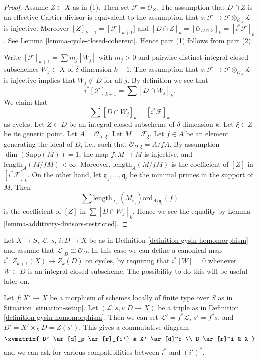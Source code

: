 \begin{proof}
Assume $Z \subset X$ as in (1). Then set $\mathcal{F} = \mathcal{O}_Z$.
The assumption that $D \cap Z$ is an effective Cartier divisor is
equivalent to the assumption that
$s : \mathcal{F} \to \mathcal{F} \otimes_{\mathcal{O}_X} \mathcal{L}$
is injective. Moreover $[Z]_{k + 1} = [\mathcal{F}]_{k + 1}]$
and $[D \cap Z]_k = [\mathcal{O}_{D \cap Z}]_k = [i^*\mathcal{F}]_k$.
See Lemma \ref{lemma-cycle-closed-coherent}.
Hence part (1) follows from part (2).

\medskip\noindent
Write $[\mathcal{F}]_{k + 1} = \sum m_j[W_j]$ with $m_j > 0$
and pairwise distinct integral closed subschemes $W_j \subset X$
of $\delta$-dimension $k + 1$. The assumption that
$s : \mathcal{F} \to \mathcal{F} \otimes_{\mathcal{O}_X} \mathcal{L}$
is injective implies that $W_j \not \subset D$ for all $j$.
By definition we see that
$$
i^*[\mathcal{F}]_{k + 1} = \sum [D \cap W_j]_k.
$$
We claim that
$$
\sum [D \cap W_j]_k = [i^*\mathcal{F}]_k
$$
as cycles.
Let $Z \subset D$ be an integral closed subscheme of $\delta$-dimension
$k$. Let $\xi \in Z$ be its generic point. Let $A = \mathcal{O}_{X, \xi}$.
Let $M = \mathcal{F}_\xi$. Let $f \in A$ be an element generating the
ideal of $D$, i.e., such that $\mathcal{O}_{D, \xi} = A/fA$.
By assumption $\dim(\text{Supp}(M)) = 1$,
the map $f : M \to M$ is injective, and
$\text{length}_A(M/fM) < \infty$. Moreover, $\text{length}_A(M/fM)$
is the coefficient of $[Z]$ in $[i^*\mathcal{F}]_k$. On the
other hand, let $\mathfrak q_1, \ldots, \mathfrak q_t$ be the minimal
primes in the support of $M$. Then
$$
\sum
\text{length}_{A_{\mathfrak q_i}}(M_{\mathfrak q_i})
\text{ord}_{A/\mathfrak q_i}(f)
$$
is the coefficient of $[Z]$ in $\sum [D \cap W_j]_k$.
Hence we see the equality by
Lemma \ref{lemma-additivity-divisors-restricted}.
\end{proof}

\begin{remark}
\label{remark-gysin-on-cycles}
Let $X \to S$, $\mathcal{L}$, $s$, $i : D \to X$ be as in
Definition \ref{definition-gysin-homomorphism} and assume
that $\mathcal{L}|_D \cong \mathcal{O}_D$. In this case we
can define a canonical map $i^* : Z_{k + 1}(X) \to Z_k(D)$
on cycles, by requiring that $i^*[W] = 0$ whenever $W \subset D$
is an integral closed subscheme.
The possibility to do this will be useful later on.
\end{remark}

\begin{remark}
\label{remark-pullback-pairs}
Let $f : X' \to X$ be a morphism of schemes locally of finite type over $S$
as in Situation \ref{situation-setup}. Let $(\mathcal{L}, s, i : D \to X)$
be a triple as in Definition \ref{definition-gysin-homomorphism}.
Then we can set $\mathcal{L}' = f^*\mathcal{L}$, $s' = f^*s$, and
$D' = X' \times_X D = Z(s')$. This gives a commutative diagram
$$
\xymatrix{
D' \ar[d]_g \ar[r]_{i'} & X' \ar[d]^f \\
D \ar[r]^i & X
}
$$
and we can ask for various compatibilities between $i^*$ and $(i')^*$.
\end{remark}

